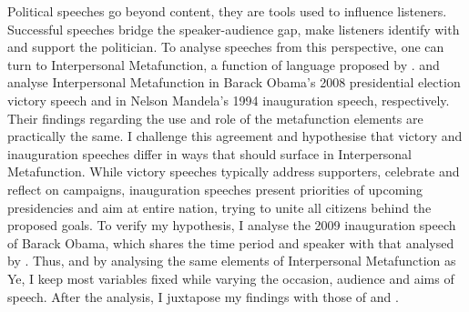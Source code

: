 \documentclass[11pt]{article}
\begin{document}
{	%
	Political speeches go beyond content, they are tools used to influence listeners. 
	Successful speeches bridge the speaker-audience gap, make listeners identify with and support the politician.
	To analyse speeches from this perspective, one can turn to Interpersonal Metafunction, a function of language proposed by \citet{Halliday1970IM}.
	\citet{Ye} and \citet{Nur} analyse Interpersonal Metafunction in Barack Obama's 2008 presidential election victory speech and in Nelson Mandela's 1994 inauguration speech, respectively.
	Their findings regarding the use and role of the metafunction elements are practically the same.
	I challenge this agreement and hypothesise that victory and inauguration speeches differ in ways that should surface in Interpersonal Metafunction.
	While victory speeches typically address supporters, celebrate and reflect on campaigns, inauguration speeches present priorities of upcoming presidencies and aim at entire nation, trying to unite all citizens behind the proposed goals.
	To verify my hypothesis, I analyse the 2009 inauguration speech of Barack Obama, which shares the time period and speaker with that analysed by \citeauthor{Ye}. 
	Thus, and by analysing the same elements of Interpersonal Metafunction as Ye, I keep most variables fixed while varying the occasion, audience and aims of speech. After the analysis, I juxtapose my findings with those of \citeauthor{Ye} and \citeauthor{Nur}.
}

\end{document}
